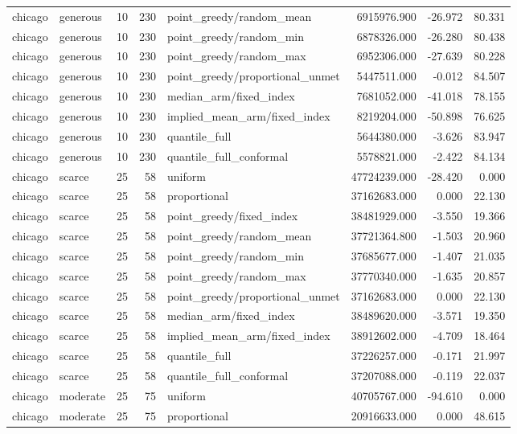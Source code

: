 \begin{tabular}{llrrlrrr}
chicago & generous & 10 & 230 & point\_greedy/random\_mean & 6915976.900 & -26.972 & 80.331 \\
chicago & generous & 10 & 230 & point\_greedy/random\_min & 6878326.000 & -26.280 & 80.438 \\
chicago & generous & 10 & 230 & point\_greedy/random\_max & 6952306.000 & -27.639 & 80.228 \\
chicago & generous & 10 & 230 & point\_greedy/proportional\_unmet & 5447511.000 & -0.012 & 84.507 \\
chicago & generous & 10 & 230 & median\_arm/fixed\_index & 7681052.000 & -41.018 & 78.155 \\
chicago & generous & 10 & 230 & implied\_mean\_arm/fixed\_index & 8219204.000 & -50.898 & 76.625 \\
chicago & generous & 10 & 230 & quantile\_full & 5644380.000 & -3.626 & 83.947 \\
chicago & generous & 10 & 230 & quantile\_full\_conformal & 5578821.000 & -2.422 & 84.134 \\
chicago & scarce & 25 & 58 & uniform & 47724239.000 & -28.420 & 0.000 \\
chicago & scarce & 25 & 58 & proportional & 37162683.000 & 0.000 & 22.130 \\
chicago & scarce & 25 & 58 & point\_greedy/fixed\_index & 38481929.000 & -3.550 & 19.366 \\
chicago & scarce & 25 & 58 & point\_greedy/random\_mean & 37721364.800 & -1.503 & 20.960 \\
chicago & scarce & 25 & 58 & point\_greedy/random\_min & 37685677.000 & -1.407 & 21.035 \\
chicago & scarce & 25 & 58 & point\_greedy/random\_max & 37770340.000 & -1.635 & 20.857 \\
chicago & scarce & 25 & 58 & point\_greedy/proportional\_unmet & 37162683.000 & 0.000 & 22.130 \\
chicago & scarce & 25 & 58 & median\_arm/fixed\_index & 38489620.000 & -3.571 & 19.350 \\
chicago & scarce & 25 & 58 & implied\_mean\_arm/fixed\_index & 38912602.000 & -4.709 & 18.464 \\
chicago & scarce & 25 & 58 & quantile\_full & 37226257.000 & -0.171 & 21.997 \\
chicago & scarce & 25 & 58 & quantile\_full\_conformal & 37207088.000 & -0.119 & 22.037 \\
chicago & moderate & 25 & 75 & uniform & 40705767.000 & -94.610 & 0.000 \\
chicago & moderate & 25 & 75 & proportional & 20916633.000 & 0.000 & 48.615 \\

\end{tabular}
